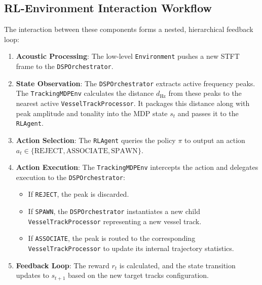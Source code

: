 \documentclass[12pt,a4paper]{article}
\begin{document}
\subsection{RL-Environment Interaction Workflow}
The interaction between these components forms a nested, hierarchical feedback loop:
\begin{enumerate}
    \item \textbf{Acoustic Processing}: The low-level \texttt{Environment} pushes a new STFT frame to the \texttt{DSPOrchestrator}.
    \item \textbf{State Observation}: The \texttt{DSPOrchestrator} extracts active frequency peaks. The \texttt{TrackingMDPEnv} calculates the distance $d_{\text{Hz}}$ from these peaks to the nearest active \texttt{VesselTrackProcessor}. It packages this distance along with peak amplitude and tonality into the MDP state $s_t$ and passes it to the \texttt{RLAgent}.
    \item \textbf{Action Selection}: The \texttt{RLAgent} queries the policy $\pi$ to output an action $a_t \in \{\text{REJECT}, \text{ASSOCIATE}, \text{SPAWN}\}$.
    \item \textbf{Action Execution}: The \texttt{TrackingMDPEnv} intercepts the action and delegates execution to the \texttt{DSPOrchestrator}:
    \begin{itemize}
        \item If \texttt{REJECT}, the peak is discarded.
        \item If \texttt{SPAWN}, the \texttt{DSPOrchestrator} instantiates a new child \texttt{VesselTrackProcessor} representing a new vessel track.
        \item If \texttt{ASSOCIATE}, the peak is routed to the corresponding \texttt{VesselTrackProcessor} to update its internal trajectory statistics.
    \end{itemize}
    \item \textbf{Feedback Loop}: The reward $r_t$ is calculated, and the state transition updates to $s_{t+1}$ based on the new target tracks configuration.
\end{enumerate}
\end{document}
